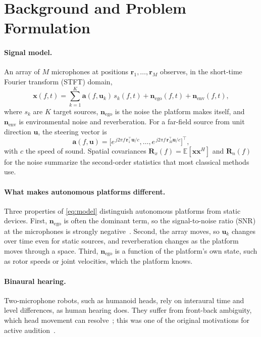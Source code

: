 \section{Background and Problem Formulation}
\label{sec:background}

\paragraph{Signal model.}
An array of $M$ microphones at positions $\mathbf{r}_1,\dots,\mathbf{r}_M$ observes, in the short-time Fourier transform (STFT) domain,
\begin{equation}
\mathbf{x}(f,t) = \sum_{k=1}^{K} \mathbf{a}(f,\mathbf{u}_k)\, s_k(f,t) + \mathbf{n}_{\text{ego}}(f,t) + \mathbf{n}_{\text{env}}(f,t),
\label{eq:model}
\end{equation}
where $s_k$ are $K$ target sources, $\mathbf{n}_{\text{ego}}$ is the noise the platform makes itself, and $\mathbf{n}_{\text{env}}$ is environmental noise and reverberation.
For a far-field source from unit direction $\mathbf{u}$, the steering vector is
\begin{equation}
\mathbf{a}(f,\mathbf{u}) = \big[e^{\,j2\pi f\,\mathbf{r}_1^{\top}\mathbf{u}/c},\dots,e^{\,j2\pi f\,\mathbf{r}_M^{\top}\mathbf{u}/c}\big]^{\top},
\label{eq:steer}
\end{equation}
with $c$ the speed of sound.
Spatial covariances $\mathbf{R}_x(f)=\mathbb{E}[\mathbf{x}\mathbf{x}^{H}]$ and $\mathbf{R}_n(f)$ for the noise summarize the second-order statistics that most classical methods use.

\paragraph{What makes autonomous platforms different.}
Three properties of \cref{eq:model} distinguish autonomous platforms from static devices.
First, $\mathbf{n}_{\text{ego}}$ is often the dominant term, so the signal-to-noise ratio (SNR) at the microphones is strongly negative~\cite{strauss2018dregon,ruizespitia2018aira}.
Second, the array moves, so $\mathbf{u}_k$ changes over time even for static sources, and reverberation changes as the platform moves through a space.
Third, $\mathbf{n}_{\text{ego}}$ is a function of the platform's own state, such as rotor speeds or joint velocities, which the platform knows.

\paragraph{Binaural hearing.}
Two-microphone robots, such as humanoid heads, rely on interaural time and level differences, as human hearing does.
They suffer from front-back ambiguity, which head movement can resolve~\cite{ma2017binaural}; this was one of the original motivations for active audition~\cite{nakadai2000active}.

